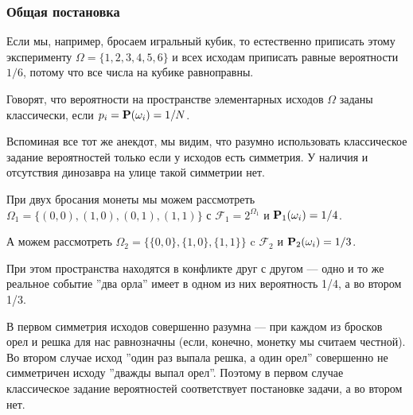 \documentclass[11 pt,russian]{article}
\begin{document}
\subsubsection{Общая постановка}
Если мы, например, бросаем игральный кубик, то естественно приписать этому эксперименту $\Omega = \{1,2,3,4,5,6\}$ и всех исходам приписать равные вероятности $1/6$, потому что все числа на кубике равноправны.
\begin{Def}
Говорят, что вероятности на пространстве элементарных исходов $\Omega$ заданы классически, если $p_i = {\bf P}(\omega_i) = 1/N$. 
\end{Def}
Вспоминая все тот же анекдот, мы видим, что разумно использовать классическое задание вероятностей только если у исходов есть симметрия. У наличия и отсутствия динозавра на улице такой симметрии нет.
\begin{Exam}
При двух бросания монеты мы можем рассмотреть $\Omega_1 = \{(0,0), (1,0), (0,1), (1,1)\}$ с $\mathcal{F}_1 = 2^{\Omega_1}$ и ${\bf P}_1(\omega_i) = 1/4$. 

А можем рассмотреть $\Omega_2 = \{\{0,0\}, \{1,0\}, \{1,1\}\}$ c $\mathcal{F}_2$ и ${\bf P}_2(\omega_i) = 1/3$. 

При этом пространства находятся в конфликте друг с другом --- одно и то же реальное событие ''два орла'' имеет в одном из них вероятность 1/4, а во втором 1/3. 

В первом симметрия исходов совершенно разумна --- при каждом из бросков орел и решка для нас равнозначны (если, конечно, монетку мы считаем честной). Во втором случае исход ''один раз выпала решка, а один орел'' совершенно не симметричен исходу ''дважды выпал орел''. Поэтому в первом случае классическое задание вероятностей соответствует постановке задачи, а во втором нет.
\end{Exam}
\end{document}
